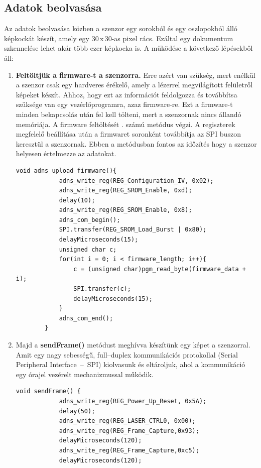 \documentclass[]{thesis-ekf}
\theoremstyle{definition}
\theoremstyle{remark}
\begin{document}
\subsection{Adatok beolvasása}
Az adatok beolvasása közben a szenzor egy sorokból és egy oszlopokból álló képkockát készít, amely egy 30\,x\,30-as pixel rács. Ezáltal egy dokumentum szkennelése lehet akár több ezer képkocka is.
A működése a következő lépésekből áll:
\begin{enumerate}
	\item \textbf{Feltöltjük a firmware-t a szenzorra.} Erre azért van szükség, mert enélkül a szenzor csak egy hardveres érékelő, amely a lézerrel megvilágított felületről képeket készít. Ahhoz, hogy ezt az információt feldolgozza és továbbítsa szüksége van egy vezérlőprogramra, azaz firmware-re. Ezt a firmware-t minden bekapcsolás után fel kell tölteni, mert a szenzornak nincs állandó memóriája. A firmware feltöltését . számú metódus végzi. A regiszterek megfelelő beállítása után a firmwaret soronként továbbítja  az SPI buszon keresztül a szenzornak. Ebben a metódusban fontos az időzítés hogy a szenzor helyesen értelmezze az adatokat.
	\begin{lstlisting}[language=Arduino,label=upload-firmware-code,caption=Firmware feltöltése]
		void adns_upload_firmware(){
			adns_write_reg(REG_Configuration_IV, 0x02);	
			adns_write_reg(REG_SROM_Enable, 0xd); 
			delay(10); 
			adns_write_reg(REG_SROM_Enable, 0x8); 
			adns_com_begin();
			SPI.transfer(REG_SROM_Load_Burst | 0x80); 
			delayMicroseconds(15);
			unsigned char c;
			for(int i = 0; i < firmware_length; i++){ 
				c = (unsigned char)pgm_read_byte(firmware_data + i);
				SPI.transfer(c);
				delayMicroseconds(15); 
			}
			adns_com_end();
		}
	\end{lstlisting}
	\clearpage
	\item Majd a \textbf{sendFrame()} metódust meghívva készítünk egy képet a szenzorral. Amit egy nagy sebességű, full--duplex kommunikációs protokollal (Serial Peripheral Interface~--~SPI) kiolvasunk és eltároljuk, ahol a kommunikáció egy órajel vezérelt mechanizmussal működik. 
	\begin{lstlisting}[language=Arduino,label=sendFrame,caption=sendFrame metódus]
		void sendFrame() {
			adns_write_reg(REG_Power_Up_Reset, 0x5A);
			delay(50);
			adns_write_reg(REG_LASER_CTRL0, 0x00);
			adns_write_reg(REG_Frame_Capture,0x93);
			delayMicroseconds(120); 
			adns_write_reg(REG_Frame_Capture,0xc5);
			delayMicroseconds(120); 

\end{lstlisting}
\end{enumerate}
\end{document}
